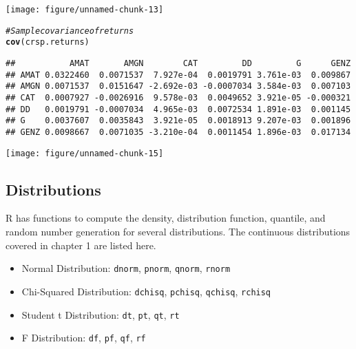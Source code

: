 \documentclass[a4paper]{article}\usepackage[]{graphicx}\usepackage[]{color}
\makeatletter
\def\maxwidth{ %
  \ifdim\Gin@nat@width>\linewidth
    \linewidth
  \else
    \Gin@nat@width
  \fi
}
\newcommand{\hlcom}[1]{\textcolor[rgb]{0.678,0.584,0.686}{\textit{#1}}}%
\newcommand{\hlkwd}[1]{\textcolor[rgb]{0.737,0.353,0.396}{\textbf{#1}}}%
\newenvironment{kframe}{%
 \def\at@end@of@kframe{}%
 \ifinner\ifhmode%
  \def\at@end@of@kframe{\end{minipage}}%
  \begin{minipage}{\columnwidth}%
 \fi\fi%
 \def\FrameCommand##1{\hskip\@totalleftmargin \hskip-\fboxsep
 \colorbox{shadecolor}{##1}\hskip-\fboxsep
     \hskip-\linewidth \hskip-\@totalleftmargin \hskip\columnwidth}%
 \MakeFramed {\advance\hsize-\width
   \@totalleftmargin\z@ \linewidth\hsize
   \@setminipage}}%
 {\par\unskip\endMakeFramed%
 \at@end@of@kframe}
\newenvironment{knitrout}{}{} %
\makeatother
\begin{document}
\begin{knitrout}
\color{fgcolor}
\texttt{[image: figure/unnamed-chunk-13]} 

\end{knitrout}


\begin{knitrout}
\color{fgcolor}\begin{kframe}
\begin{alltt}
\hlcom{# Sample covariance of returns}
\hlkwd{cov}(crsp.returns)
\end{alltt}
\begin{verbatim}
##           AMAT       AMGN        CAT         DD         G      GENZ
## AMAT 0.0322460  0.0071537  7.927e-04  0.0019791 3.761e-03  0.009867
## AMGN 0.0071537  0.0151647 -2.692e-03 -0.0007034 3.584e-03  0.007103
## CAT  0.0007927 -0.0026916  9.578e-03  0.0049652 3.921e-05 -0.000321
## DD   0.0019791 -0.0007034  4.965e-03  0.0072534 1.891e-03  0.001145
## G    0.0037607  0.0035843  3.921e-05  0.0018913 9.207e-03  0.001896
## GENZ 0.0098667  0.0071035 -3.210e-04  0.0011454 1.896e-03  0.017134
\end{verbatim}
\end{kframe}
\end{knitrout}


\begin{knitrout}
\color{fgcolor}
\texttt{[image: figure/unnamed-chunk-15]} 

\end{knitrout}



\subsection{Distributions}
R has functions to compute the density, distribution function, quantile, and random number generation for several distributions. The continuous distributions covered in chapter 1 are listed here.
\begin{itemize}
\item Normal Distribution: \verb"dnorm", \verb"pnorm", \verb"qnorm", \verb"rnorm"

\item Chi-Squared Distribution: \verb"dchisq", \verb"pchisq", \verb"qchisq", \verb"rchisq"

\item Student t Distribution: \verb"dt", \verb"pt", \verb"qt", \verb"rt"

\item F Distribution: \verb"df", \verb"pf", \verb"qf", \verb"rf"
\end{itemize}
\end{document}
